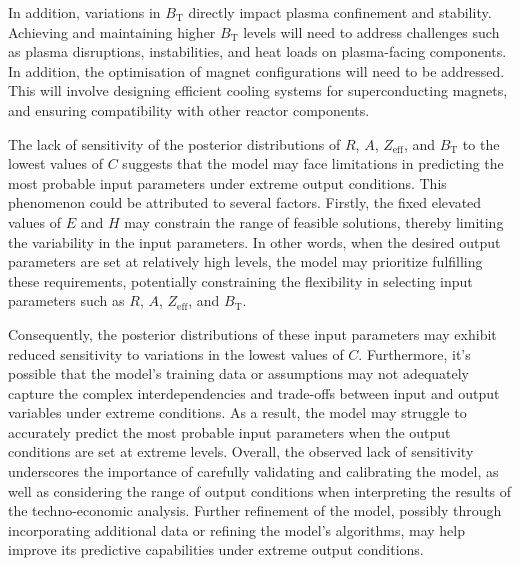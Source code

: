 \documentclass[journal]{IEEEtran}
\begin{document}
In addition, variations in $B_{\text{T}}$ directly impact plasma confinement and stability. Achieving and maintaining higher $B_{\text{T}}$ levels will need to address challenges such as plasma disruptions, instabilities, and heat loads on plasma-facing components. In addition, the optimisation of magnet configurations will need to be addressed. This will involve designing efficient cooling systems for superconducting magnets, and ensuring compatibility with other reactor components. 

The lack of sensitivity of the posterior distributions of $R$, $A$, $Z_{\text{eff}}$, and $B_{\text{T}}$ to the lowest values of $C$ suggests that the model may face limitations in predicting the most probable input parameters under extreme output conditions. This phenomenon could be attributed to several factors. Firstly, the fixed elevated values of $E$ and $H$ may constrain the range of feasible solutions, thereby limiting the variability in the input parameters. In other words, when the desired output parameters are set at relatively high levels, the model may prioritize fulfilling these requirements, potentially constraining the flexibility in selecting input parameters such as $R$, $A$, $Z_{\text{eff}}$, and $B_{\text{T}}$. 

Consequently, the posterior distributions of these input parameters may exhibit reduced sensitivity to variations in the lowest values of $C$. Furthermore, it's possible that the model's training data or assumptions may not adequately capture the complex interdependencies and trade-offs between input and output variables under extreme conditions. As a result, the model may struggle to accurately predict the most probable input parameters when the output conditions are set at extreme levels. Overall, the observed lack of sensitivity underscores the importance of carefully validating and calibrating the model, as well as considering the range of output conditions when interpreting the results of the techno-economic analysis. Further refinement of the model, possibly through incorporating additional data or refining the model's algorithms, may help improve its predictive capabilities under extreme output conditions.


\end{document}
